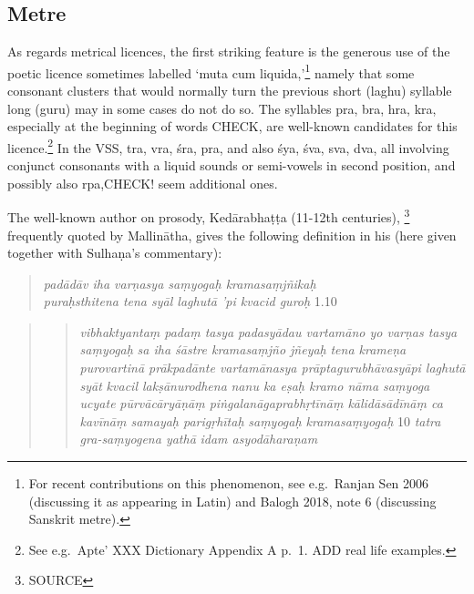\documentclass[11pt]{book}
\begin{document}
\subsection{Metre}
As regards metrical licences, the first striking feature is the generous
use of the poetic licence sometimes labelled `muta cum
liquida,'\footnote{For recent contributions on this phenomenon, see
  e.g.~Ranjan Sen 2006 (discussing it as appearing in Latin) and Balogh
  2018, note 6 (discussing Sanskrit metre).} namely that some consonant
clusters that would normally turn the previous short (laghu) syllable
long (guru) may in some cases do not do so. The syllables pra, bra, hra,
kra, especially at the beginning of words CHECK, are well-known
candidates for this licence.\footnote{See e.g.~Apte' XXX Dictionary
  Appendix A p.~1. ADD real life examples.} In the VSS, tra, vra, śra,
pra, and also śya, śva, sva, dva, all involving conjunct consonants with
a liquid sounds or semi-vowels in second position, and possibly also
rpa,CHECK! seem additional ones.

The well-known author on prosody, Kedārabhaṭṭa (11-12th centuries),%
		\footnote{SOURCE}	 
frequently quoted by Mallinātha, gives the following definition in his
 (here given together with Sulhaṇa's  commentary):

\begin{quote}
\emph{padādāv iha varṇasya saṃyogaḥ kramasaṃjñikaḥ} \textbar{}\\
\emph{puraḥsthitena tena syāl laghutā 'pi kvacid guroḥ}
\textbar{}\textbar{} 1.10 \textbar{}\textbar{}
\end{quote}

\begin{quote}
\begin{quote}
\emph{vibhaktyantaṃ padaṃ tasya padasyādau vartamāno yo varṇas tasya
saṃyogaḥ} \textbar{} \emph{sa iha śāstre kramasaṃjño jñeyaḥ} \textbar{}
\emph{tena krameṇa purovartinā prākpadānte vartamānasya
prāptagurubhāvasyāpi laghutā syāt} \textbar{} \emph{kvacil
lakṣānurodhena} \textbar{} \emph{nanu ka eṣaḥ kramo nāma saṃyoga ucyate}
\textbar{} \emph{pūrvācāryāṇāṃ piṅgalanāgaprabhṛtīnāṃ kālidāsādīnāṃ ca
kavīnāṃ samayaḥ parigṛhītaḥ} \textbar{} \emph{saṃyogaḥ kramasaṃyogaḥ}
\textbar{}\textbar{} 10 \textbar{}\textbar{} \emph{tatra gra-saṃyogena
yathā} \textbar{} \emph{idam asyodāharaṇam} \textbar{}
\end{quote}
\end{quote}
\end{document}

